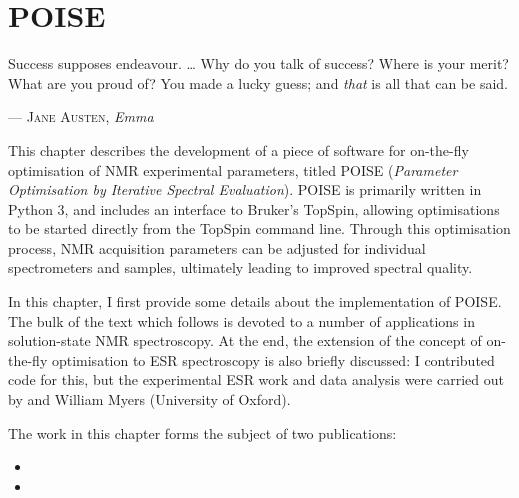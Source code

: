 \chapter{POISE}
\label{chpt:poise}

\epigraph{\singlespacing%
Success supposes endeavour. \ldots{} Why do you talk of success? Where is your merit? What are you proud of? You made a lucky guess; and \textit{that} is all that can be said.
}{--- \textsc{Jane Austen}, \textit{Emma}}

This chapter describes the development of a piece of software for on-the-fly optimisation of NMR experimental parameters, titled POISE (\textit{Parameter Optimisation by Iterative Spectral Evaluation}).
POISE is primarily written in Python 3, and includes an interface to Bruker's TopSpin, allowing optimisations to be started directly from the TopSpin command line.
Through this optimisation process, NMR acquisition parameters can be adjusted for individual spectrometers and samples, ultimately leading to improved spectral quality.

In this chapter, I first provide some details about the implementation of POISE.
The bulk of the text which follows is devoted to a number of applications in solution-state NMR spectroscopy.
At the end, the extension of the concept of on-the-fly optimisation to ESR spectroscopy is also briefly discussed: I contributed code for this, but the experimental ESR work and data analysis were carried out by \JBV{} and William Myers (University of Oxford).

The work in this chapter forms the subject of two publications:

\begin{itemize}
    \item {}
    \item {}
\end{itemize}

\clearpage







\printbibliography[heading=subbibnumbered]{}
